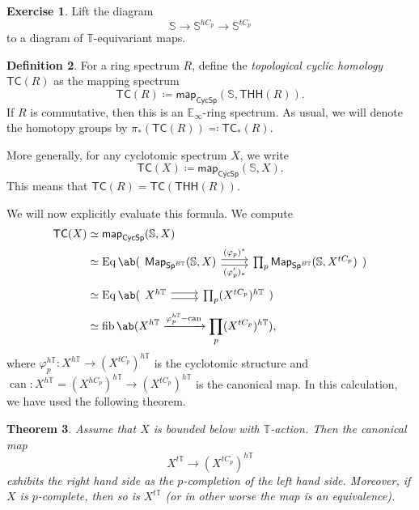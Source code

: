 \documentclass[10pt, oneside]{memoir}
\newtheorem{thm}{Theorem}[subsection]
\theoremstyle{definition}
\newtheorem{defn}[thm]{Definition}
\newtheorem{exer}[thm]{Exercise}
\theoremstyle{remark}
\theoremstyle{plain}
\theoremstyle{definition}
\theoremstyle{remark}
\newcommand{\E}{\mathbb{E}}
\newcommand{\bS}{\mathbb{S}}
\newcommand{\T}{\mathbb{T}}
\newcommand{\mr}[1]{\mathrm{#1}}
\newcommand{\on}[1]{\operatorname{#1}}
\newcommand{\ms}[1]{\mathsf{#1}}
\newcommand{\1}{\mathbf{1}}
\newcommand{\2}{\mathbf{2}}
\newcommand{\3}{\mathbf{3}}
\newcommand{\THH}{\ms{THH}}
\newcommand{\TC}{\ms{TC}}
\begin{document}
\begin{exer}
    Lift the diagram
    \[ \bS \to \bS^{hC_p} \to \bS^{tC_p} \]
    to a diagram of \(\T \)-equivariant maps.
\end{exer}

\begin{defn}
    For a ring spectrum \(R \), define the \textit{topological cyclic homology} \(\TC(R) \) as the mapping spectrum
    \[ \TC(R) \coloneqq \ms{map}_{\ms{CycSp}}(\bS, \THH(R)). \]
    If \(R \) is commutative, then this is an \(\E_{\infty} \)-ring spectrum. As usual, we will denote the homotopy groups by \(\pi_*(\TC(R)) \eqqcolon \TC_*(R) \).

    More generally, for any cyclotomic spectrum \(X \), we write
    \[ \TC(X) \coloneqq \ms{map}_{\ms{CycSp}}(\bS, X). \]
    This means that \(\TC(R) = \TC(\THH(R)) \).
\end{defn}

We will now explicitly evaluate this formula. We compute
\begin{align*}
    \TC(X) &\simeq \ms{map}_{\ms{CycSp}}(\bS, X) \\ 
    &\simeq \on{Eq} \ab(\begin{tikzcd}[ampersand replacement=\&]
        \ms{Map}_{\ms{Sp}^{B\T}}(\bS,X) \ar[shift left=1]{r}{(\varphi_p)^*} \ar[shift right=1]{r}[swap]{(\varphi_p')_*} \& \prod_p \ms{Map}_{\ms{Sp}^{B\T}}(\bS, X^{tC_p})
    \end{tikzcd}) \\
    &\simeq \on{Eq} \ab(\begin{tikzcd}[ampersand replacement=\&]
        X^{h\T} \ar[shift left=1]{r} \ar[shift right=1]{r} \& \prod_p (X^{tC_p})^{h\T}
    \end{tikzcd}) \\
    &\simeq \on{fib} \ab(X^{h\T} \xrightarrow{\varphi_p^{h\T}-\mr{can}} \prod_p (X^{tC_p})^{h\T}),
\end{align*}
where \(\varphi_p^{h\T} \colon X^{h\T} \to (X^{tC_p})^{h\T} \) is the cyclotomic structure and \(\on{can} \colon X^{h\T} = (X^{hC_p})^{h\T} \to (X^{tC_p})^{h\T} \)
is the canonical map. In this calculation, we have used the following theorem.

\begin{thm}\label{thm:ns}
    Assume that \(X \) is bounded below with \(\T \)-action. Then the canonical map
    \[ X^{t\T} \to (X^{tC_p})^{h\T} \]
    exhibits the right hand side as the \(p \)-completion of the left hand side. Moreover, if \(X \) is \(p \)-complete, then so is \(X^{t\T} \) (or in other worse the map is an equivalence).
\end{thm}
\end{document}
